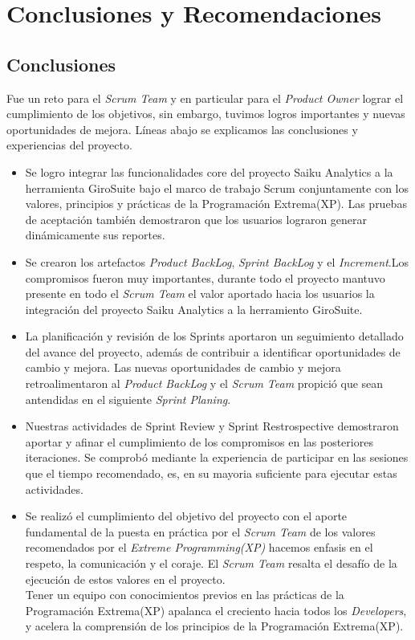 \chapter{Conclusiones y Recomendaciones} \label{chapter:IV}
\begin{spacing}{1.5}
\section{Conclusiones}
	Fue un reto para el \textit{Scrum Team} y en particular para el \textit{Product Owner} lograr el cumplimiento de los objetivos, sin embargo, tuvimos logros importantes y nuevas oportunidades de mejora. L\'{i}neas abajo se explicamos las conclusiones y experiencias del proyecto.
\begin{itemize}
	\item Se logro integrar las funcionalidades core del proyecto Saiku Analytics a la herramienta GiroSuite bajo el marco de trabajo Scrum conjuntamente con los valores, principios y pr\'{a}cticas de la Programaci\'{o}n Extrema(XP). Las pruebas de aceptaci\'{o}n tambi\'{e}n demostraron que los usuarios lograron generar din\'{a}micamente sus reportes.
	
	\item Se crearon los artefactos \textit{Product BackLog}, \textit{Sprint BackLog} y el \textit{Increment}.Los compromisos fueron muy importantes, durante todo el proyecto mantuvo presente en todo el \textit{Scrum Team} el valor aportado hacia los usuarios la integraci\'{o}n del proyecto Saiku Analytics a la herramiento GiroSuite.
	
	\item La planificaci\'{o}n y revisi\'{o}n de los Sprints aportaron un seguimiento detallado del avance del proyecto, adem\'{a}s de contribuir a identificar oportunidades de cambio y mejora. Las nuevas oportunidades de cambio y mejora retroalimentaron al \textit{Product BackLog} y el \textit{Scrum Team} propici\'{o} que sean antendidas en el siguiente \textit{Sprint Planing}.
	
	\item Nuestras actividades de Sprint Review y Sprint Restrospective demostraron aportar y afinar el cumplimiento de los compromisos en las posteriores iteraciones. Se comprob\'{o} mediante la experiencia de participar en las sesiones que el tiempo recomendado, es, en su mayoria suficiente para ejecutar estas actividades.
	
	\item Se realiz\'{o} el cumplimiento del objetivo del proyecto con el aporte fundamental de la puesta en pr\'{a}ctica por el \textit{Scrum Team} de los valores recomendados por el \textit{Extreme Programming(XP)} hacemos enfasis en el respeto, la comunicaci\'{o}n y el coraje. El \textit{Scrum Team} resalta el desaf\'{i}o de la ejecuci\'{o}n de estos valores en el proyecto.\\
	Tener un equipo con conocimientos previos en las pr\'{a}cticas de la Programaci\'{o}n Extrema(XP) apalanca el creciento hacia todos los \textit{Developers}, y acelera la comprensi\'{o}n de los principios de la Programaci\'{o}n Extrema(XP).
	

\end{itemize}
\end{spacing}

